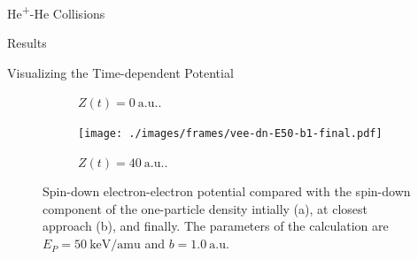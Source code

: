 \documentclass[a5paper, 9 pt]{extreport}
\begin{document}
\begin{chapter}{\texorpdfstring{He\textsuperscript{+}}{He+}-He Collisions \label{chap:hephe}}
\begin{section}{Results \label{sec:hephe-disc}}
\begin{subsection}{Visualizing the Time-dependent Potential \label{sec:visual}}
\begin{figure}[b]
\begin{subfigure}{.49\textwidth}
               \caption{$Z(t) = 0~\mathrm{a.u.}$. \label{fig:dnC}}
            \end{subfigure}
            \begin{subfigure}{.49\textwidth}
               \centering
               \texttt{[image: ./images/frames/vee-dn-E50-b1-final.pdf]}
               \caption{$Z(t) = 40~\mathrm{a.u.}$. \label{fig:dnF}}
            \end{subfigure}
            \caption[Spin-down electron-electron potential]
                    {Spin-down electron-electron potential compared with the spin-down component of the
                    one-particle density intially (a), at closest approach (b), and finally.
                    The parameters of the calculation are $E_P = 50~\mathrm{keV/amu}$ and
                    $b = 1.0~\mathrm{a.u.}$ \label{fig:dnPlots}}
         \end{figure}


\end{subsection}
\end{section}
\end{chapter}
\end{document}
